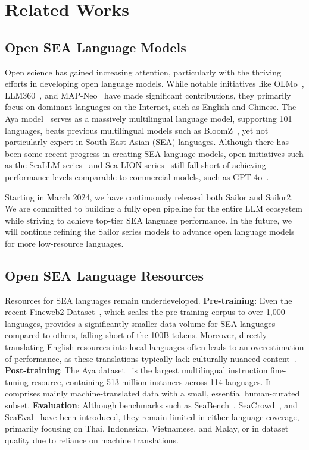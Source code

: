 \section{Related Works}

\subsection{Open SEA Language Models}

Open science has gained increasing attention, particularly with the thriving efforts in developing open language models. 
While notable initiatives like OLMo~\citep{groeneveld2024olmo}, LLM360~\citep{liu2023llm360}, and MAP-Neo~\citep{zhang2024map} have made significant contributions, they primarily focus on dominant languages on the Internet, such as English and Chinese.
The Aya model~\citep{ustun-etal-2024-ayamodel} serves as a massively multilingual language model, supporting 101 languages, beats previous multilingual models such as BloomZ~\citep{muennighoff2022crosslingual}, yet not particularly expert in South-East Asian (SEA) languages.
Although there has been some recent progress in creating SEA language models, open initiatives such as the SeaLLM series~\citep{nguyen-etal-2024-seallms, zhang2024seallms} and Sea-LION series~\citep{sea_lion_2024} still fall short of achieving performance levels comparable to commercial models, such as GPT-4o~\citep{achiam2023gpt4}.

Starting in March 2024, we have continuously released both Sailor and Sailor2. 
We are committed to building a fully open pipeline for the entire LLM ecosystem while striving to achieve top-tier SEA language performance. 
In the future, we will continue refining the Sailor series models to advance open language models for more low-resource languages.


\subsection{Open SEA Language Resources}
\label{sec:related_work_resource}

Resources for SEA languages remain underdeveloped.
\textbf{Pre-training}: Even the recent Fineweb2 Dataset~\citep{penedo2024fineweb-2}, which scales the pre-training corpus to over 1,000 languages, provides a significantly smaller data volume for SEA languages compared to others, falling short of the 100B tokens. Moreover, directly translating English resources into local languages often leads to an overestimation of performance, as these translations typically lack culturally nuanced content~\citep{singh2024global}.
\textbf{Post-training}: The Aya dataset~\citep{singh2024aya} is the largest multilingual instruction fine-tuning resource, containing 513 million instances across 114 languages. It comprises mainly machine-translated data with a small, essential human-curated subset.
\textbf{Evaluation}: Although benchmarks such as SeaBench~\citep{liu2025seaexam}, SeaCrowd~\citep{lovenia2024seacrowd}, and SeaEval~\citep{SeaEval2023} have been introduced, they remain limited in either language coverage, primarily focusing on Thai, Indonesian, Vietnamese, and Malay, or in dataset quality due to reliance on machine translations.


